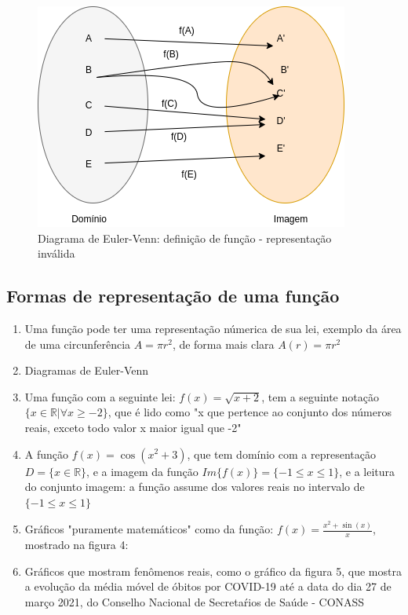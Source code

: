 \begin{multicols*}{2}
                
                \begin{figure}[H]
                    \centering
                    \caption{Diagrama de Euler-Venn: definição de função - representação inválida}
                    \includegraphics[scale=0.4]{assets/rafael/img2.png}
                \end{figure}	
            \subsection*{Formas de representação de uma função}
                \begin{enumerate}
                    \item Uma função pode ter uma representação númerica de sua lei, exemplo da área de uma 						circunferência $A = \pi r^2$, de forma mais clara $A(r) = \pi r^2$
                    \item Diagramas de Euler-Venn
                    \item Uma função com a seguinte lei: $f(x) = \sqrt{x+2}$, tem a seguinte notação 						$ \{x \in \mathbb{R} | \forall x  \ge -2 \} $, que é lido como "x que pertence ao 						conjunto dos números reais, exceto todo valor x maior igual que -2"
                    \item A função $f(x) = \cos(x^2 +3)$, que tem domínio com a representação 
                    $D = \{ x \in \mathbb{R} \}$, e a imagem da função $Im\{ f(x) \} =
                         \{ -1 \le x \le 1 \} $, e a leitura do conjunto imagem:  a função assume dos 						valores reais no intervalo de $\{ -1 \le x \le 1 \}$
                    \item Gráficos "puramente matemáticos" como da função:
                     $f(x) = \frac{ x^2 + \sin(x) }{x}$, mostrado na figura 4:
                     \item Gráficos que mostram fenômenos reais, como o gráfico da figura 5, que mostra a 					evolução da média móvel de óbitos por COVID-19 até a data do dia 27 de março 2021, do 					Conselho Nacional de Secretaŕios de Saúde - CONASS
                

\end{enumerate}
\end{multicols*}
